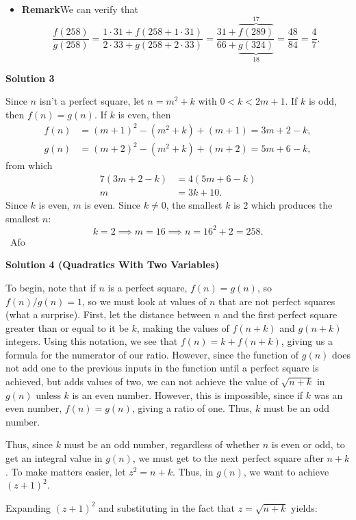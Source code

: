 \begin{enumerate}
\begin{itemize}
        \item \textbf{Remark}We can verify that 
 \[\frac{f(258)}{g(258)}=\frac{1\cdot31+f(258+1\cdot31)}{2\cdot33+g(258+2\cdot33)}=\frac{31+\overbrace{f(289)}^{17}}{66+\underbrace{g(324)}_{18}}=\frac{48}{84}=\frac47.\]


            \end{itemize}
            



\textbf{Solution 3}

Since $n$ isn't a perfect square, let $n=m^2+k$ with $0<k<2m+1$. If $k$ is odd, then $f(n)=g(n)$. If $k$ is even, then
 \begin{align*} f(n)&=(m+1)^2-(m^2+k)+(m+1)=3m+2-k, \\ g(n)&=(m+2)^2-(m^2+k)+(m+2)=5m+6-k, \end{align*}
from which
 \begin{align*} 7(3m+2-k)&=4(5m+6-k) \\ m&=3k+10. \end{align*}
Since $k$ is even, $m$ is even. Since $k\neq 0$, the smallest $k$ is $2$ which produces the smallest $n$: 
 \[k=2 \implies m=16 \implies n=16^2+2=\boxed{258}.\]~Afo

 



\textbf{Solution 4 (Quadratics With Two Variables)}

To begin, note that if $n$ is a perfect square, $f(n)=g(n)$, so $f(n)/g(n)=1$, so we must look at values of $n$ that are not perfect squares (what a surprise). First, let the distance between $n$ and the first perfect square greater than or equal to it be $k$, making the values of $f(n+k)$ and $g(n+k)$ integers. Using this notation, we see that $f(n)=k+f(n+k)$, giving us a formula for the numerator of our ratio. However, since the function of $g(n)$ does not add one to the previous inputs in the function until a perfect square is achieved, but adds values of two, we can not achieve the value of $\sqrt{n+k}$ in $g(n)$ unless $k$ is an even number. However, this is impossible, since if $k$ was an even number, $f(n)=g(n)$, giving a ratio of one. Thus, $k$ must be an odd number.

 Thus, since $k$ must be an odd number, regardless of whether $n$ is even or odd, to get an integral value in $g(n)$, we must get to the next perfect square after $n+k$. To make matters easier, let $z^2=n+k$. Thus, in $g(n)$, we want to achieve $(z+1)^2$. 

 Expanding $(z+1)^2$ and substituting in the fact that $z=\sqrt{n+k}$ yields:


\end{enumerate}

